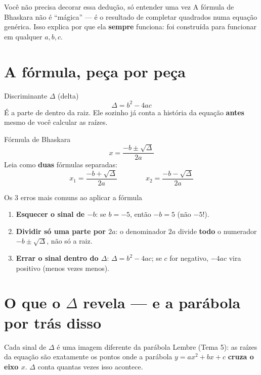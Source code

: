 \documentclass[12pt,a4paper]{article}
\begin{document}
\begin{macete}{Você não precisa decorar essa dedução, só entender uma vez}
A fórmula de Bhaskara não é ``mágica'' — é o resultado de completar
quadrados numa equação genérica. Isso explica por que ela \textbf{sempre}
funciona: foi construída para funcionar em qualquer $a,b,c$.
\end{macete}

\section{A fórmula, peça por peça}

\begin{definicao}{Discriminante $\Delta$ (delta)}
\[
\Delta = b^2-4ac
\]
É a parte de dentro da raiz. Ele sozinho já conta a história da equação
\textbf{antes} mesmo de você calcular as raízes.
\end{definicao}

\begin{definicao}{Fórmula de Bhaskara}
\[
x = \frac{-b\pm\sqrt{\Delta}}{2a}
\]
Leia como \textbf{duas} fórmulas separadas:
\[
x_1 = \frac{-b+\sqrt{\Delta}}{2a} \qquad\qquad x_2 = \frac{-b-\sqrt{\Delta}}{2a}
\]
\end{definicao}

\begin{atencao}{Os 3 erros mais comuns ao aplicar a fórmula}
\begin{enumerate}[nosep]
  \item \textbf{Esquecer o sinal de $-b$}: se $b=-5$, então $-b=5$ (não $-5$!).
  \item \textbf{Dividir só uma parte por $2a$}: o denominador $2a$ divide
  \textbf{todo} o numerador $-b\pm\sqrt\Delta$, não só a raiz.
  \item \textbf{Errar o sinal dentro do $\Delta$}: $\Delta=b^2-4ac$; se $c$
  for negativo, $-4ac$ vira positivo (menos vezes menos).
\end{enumerate}
\end{atencao}

\section{O que o $\Delta$ revela — e a parábola por trás disso}

\begin{dica}{Cada sinal de $\Delta$ é uma imagem diferente da parábola}
Lembre (Tema 5): as raízes da equação são exatamente os pontos onde a
parábola $y=ax^2+bx+c$ \textbf{cruza o eixo $x$}. $\Delta$ conta quantas
vezes isso acontece.
\end{dica}
\end{document}
